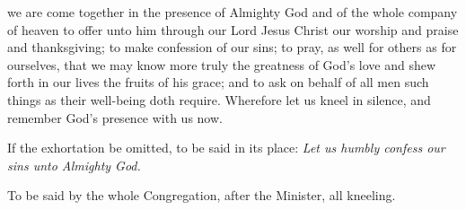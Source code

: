  we are come together in the presence of Almighty God and of the whole company of heaven to offer unto him through our Lord Jesus Christ our worship and praise and thanksgiving; to make confession of our sins; to pray, as well for others as for ourselves, that we may know more truly the greatness of God's love and shew forth in our lives the fruits of his grace; and to ask on behalf of all men such things as their well-being doth require. Wherefore let us kneel in silence, and remember God's presence with us now.

\begin{rubric}%
	If the exhortation be omitted, to be said in its place: \emph{Let us humbly confess our sins unto Almighty God.}
\end{rubric}

\begin{rubric}
    To be said by the whole Congregation, after the Minister, all kneeling.
\end{rubric}

